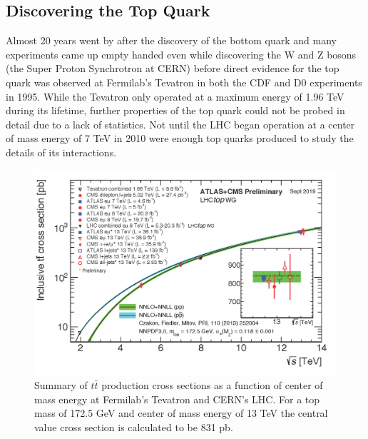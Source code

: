 \subsection{Discovering the Top Quark}

Almost 20 years went by after the discovery of the bottom quark and many experiments came up empty handed even while discovering the W and Z bosons (the Super Proton Synchrotron at CERN) before direct evidence for the top quark was observed at Fermilab's Tevatron in both the CDF and D0 experiments in 1995\cite{TopObs,TopObsD0}.  While the Tevatron only operated at a maximum energy of 1.96 TeV during its lifetime, further properties of the top quark could not be probed in detail due to a lack of statistics.  Not until the LHC began operation at a center of mass energy of 7 TeV in 2010 were enough top quarks produced to study the details of its interactions. 
\begin{figure}[h!]
	\centering
	\includegraphics[width=\columnwidth]{../ThesisImages/Theory/ttprodxsec.png}
	\caption[Summary of $t\bar{t}$ production cross sections as a function of center of mass energy at Fermilab's Tevatron and CERN's LHC.]{Summary of $t\bar{t}$ production cross sections as a function of center of mass energy at Fermilab's Tevatron and CERN's LHC.  For a top mass of 172.5 GeV and center of mass energy of 13 TeV the central value cross section is calculated to be 831 pb\cite{TopWG}. }
	\label{fig:ttbarXSec}
\end{figure}

